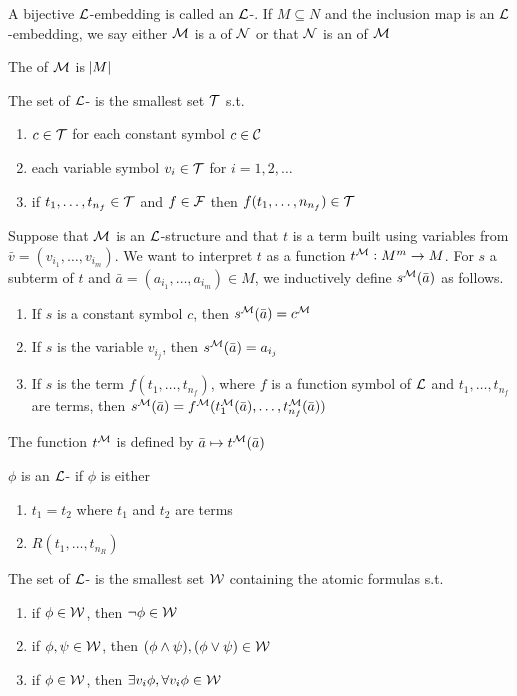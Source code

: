 \documentclass[11pt]{article}
\begin{document}
A bijective \(\mathcal{L}\)-embedding is called an \(\mathcal{L}\)-. If
\(M\subseteq N\) and the inclusion map is an \(\mathcal{L}\)-embedding, we say either
\(\mathcal{M}\) is a  of \(\mathcal{N}\) or that \(\mathcal{N}\) is an 
of \(\mathcal{M}\)

The  of \(\mathcal{M}\) is \(\abs{M}\)

\begin{definition}[]
The set of \(\mathcal{L}\)- is the smallest set \(\mathcal{T}\) s.t.
\begin{enumerate}
\item \(c\in\mathcal{T}\) for each constant symbol \(c\in\mathcal{C}\)
\item each variable symbol \(v_i\in\mathcal{T}\) for \(i=1,2,\dots\)
\item if \(t_1,\dots,t_{n_f}\in\mathcal{T}\) and \(f\in\mathcal{F}\) then
\(f(t_1,\dots,n_{n_f})\in\mathcal{T}\)
\end{enumerate}
\end{definition}


Suppose that \(\mathcal{M}\) is an \(\mathcal{L}\)-structure and that \(t\) is a term built
using variables from \(\bar{v}=(v_{i_1},\dots,v_{i_m})\). We want to interpret
\(t\) as a function \(t^{\mathcal{M}}:M^m\to M\). For \(s\) a subterm of \(t\) and
\(\bar{a}=(a_{i_1},\dots,a_{i_m})\in M\), we inductively define
\(s^{\mathcal{M}}(\bar{a})\) as follows.
\begin{enumerate}
\item If \(s\) is a constant symbol \(c\), then \(s^{\mathcal{M}}(\bar{a})=c^{\mathcal{M}}\)
\item If \(s\) is the variable \(v_{i_j}\), then \(s^{\mathcal{M}}(\bar{a})=a_{i_j}\)
\item If \(s\) is the term \(f(t_1,\dots,t_{n_f})\), where \(f\) is a function symbol
of \(\mathcal{L}\) and \(t_1,\dots,t_{n_f}\) are terms, then 
\(s^{\mathcal{M}}(\bar{a})=f^{\mathcal{M}}(t^{\mathcal{M}}_1(\bar{a}),\dots,t_{n_f}^{\mathcal{M}}(\bar{a}))\)
\end{enumerate}


The function \(t^{\mathcal{M}}\) is defined by \(\bar{a}\mapsto t^{\mathcal{M}}(\bar{a})\)


\begin{definition}[]
\(\phi\) is an  \(\mathcal{L}\)- if \(\phi\) is either
\begin{enumerate}
\item \(t_1=t_2\) where \(t_1\) and \(t_2\) are terms
\item \(R(t_1,\dots,t_{n_R})\)
\end{enumerate}


The set of \(\mathcal{L}\)- is the smallest set \(\mathcal{W}\) containing the
atomic formulas s.t.
\begin{enumerate}
\item if \(\phi\in\mathcal{W}\), then \(\neg\phi\in\mathcal{W}\)
\item if \(\phi,\psi\in\mathcal{W}\), then \((\phi\wedge\psi),(\phi\vee\psi)\in\mathcal{W}\)
\item if \(\phi\in\mathcal{W}\), then \(\exists v_i\phi,\forall v_i\phi\in\mathcal{W}\)
\end{enumerate}
\end{definition}
\end{document}
